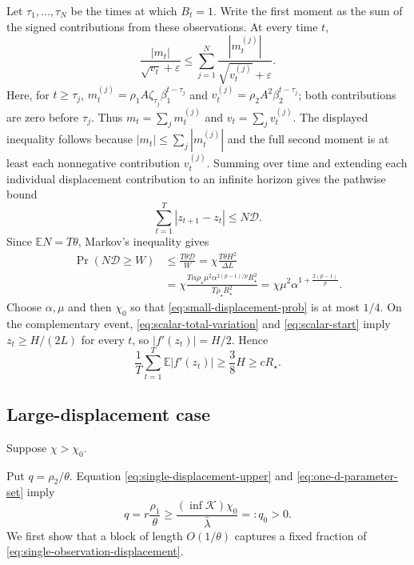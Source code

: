 \documentclass[11pt,letterpaper]{article}
\theoremstyle{definition}
\newcommand{\E}{\mathbb E}
\newcommand{\eps}{\varepsilon}
\begin{document}
Let $\tau_1,\ldots,\tau_N$ be the times at which $B_t=1$.  Write the first
moment as the sum of the signed contributions from these observations.
At every time $t$,
\begin{equation}
\frac{|m_t|}{\sqrt{v_t}+\eps}
\le\sum_{j=1}^N
\frac{|m_t^{(j)}|}{\sqrt{v_t^{(j)}}+\eps}.
\label{eq:impulse-decomposition}
\end{equation}
Here, for $t\ge\tau_j$,
$m_t^{(j)}=\rho_1A\zeta_{\tau_j}\beta_1^{t-\tau_j}$ and
$v_t^{(j)}=\rho_2A^2\beta_2^{t-\tau_j}$; both contributions are
zero before $\tau_j$. Thus $m_t=\sum_jm_t^{(j)}$ and
$v_t=\sum_jv_t^{(j)}$.
The displayed inequality follows because $|m_t|\le\sum_j|m_t^{(j)}|$
and the full second moment is at least
each nonnegative contribution $v_t^{(j)}$.  Summing over time and extending
each individual displacement contribution to an infinite horizon gives the pathwise bound
\begin{equation}
\sum_{t=1}^T|z_{t+1}-z_t|\le N\mathcal D.
\label{eq:scalar-total-variation}
\end{equation}
Since $\E N=T\theta$, Markov's inequality gives
\begin{align}
\Pr(N\mathcal D\ge W)
&\le\frac{T\theta\mathcal D}{W}
=\chi\frac{T\theta H^2}{\Delta L}\nonumber\\
&=\chi\frac{T\alpha\rho_\star\mu^2\alpha^{2(p-1)/p}R_\star^2}
{T\rho_\star R_\star^2}
=\chi\mu^2\alpha^{1+\frac{2(p-1)}p}.
\label{eq:small-displacement-prob}
\end{align}
Choose $\alpha,\mu$ and then
$\chi_0$ so that \eqref{eq:small-displacement-prob} is at most $1/4$.
On the complementary event, \eqref{eq:scalar-total-variation} and
\eqref{eq:scalar-start} imply
$z_t\ge H/(2L)$ for every $t$, so
$|f'(z_t)|=H/2$. Hence
\begin{equation}
\frac1T\sum_{t=1}^T\E|f'(z_t)|
\ge\frac38H
\ge cR_\star.
\label{eq:small-displacement-lower}
\end{equation}

\subsection{Large-displacement case}

Suppose $\chi>\chi_0$.

Put $q=\rho_2/\theta$. Equation
\eqref{eq:single-displacement-upper} and
\eqref{eq:one-d-parameter-set} imply
\begin{equation}
q=r\frac{\rho_1}{\theta}
\ge\frac{(\inf\mathcal K)\chi_0}{\bar\lambda}
=:q_0>0.
\label{eq:q-lower}
\end{equation}
We first show that a block of length $O(1/\theta)$ captures a fixed
fraction of \eqref{eq:single-observation-displacement}.
\end{document}
